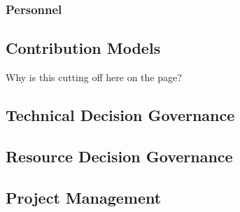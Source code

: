 \subsubsection{Personnel}
\label{ch:exec-comp-gov-res-hum}

\subsection{Contribution Models}	
\label{ch:exec-comp-gov-contrib}
Why is this cutting off here on the page?

\subsection{Technical Decision Governance}	
\label{ch:exec-comp-gov-tech}

\subsection{Resource Decision Governance	}
\label{ch:exec-comp-gov-resdec}

\subsection{Project Management}	
\label{ch:exec-comp-gov-pm}
